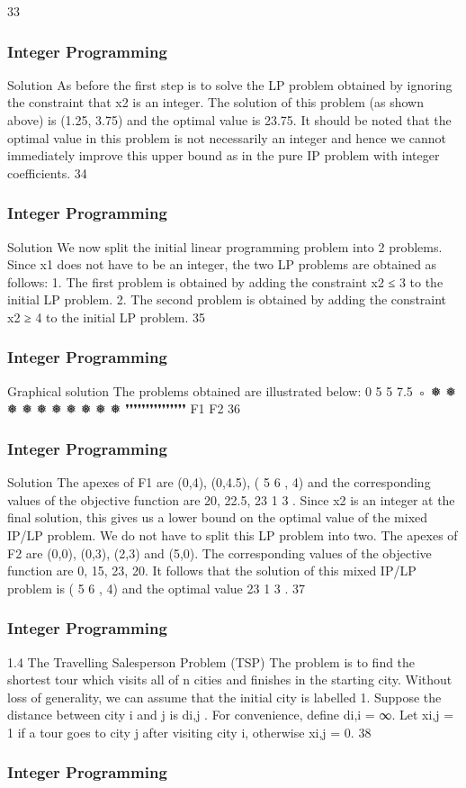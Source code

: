 \begin{frame}
33 \end{frame}  \begin{frame} \frametitle{Integer Programming}     
Solution
As before the first step is to solve the LP problem obtained by
ignoring the constraint that x2 is an integer. The solution of this
problem (as shown above) is (1.25, 3.75) and the optimal value is
23.75.
It should be noted that the optimal value in this problem is not
necessarily an integer and hence we cannot immediately improve
this upper bound as in the pure IP problem with integer
coefficients.
34 \end{frame}  \begin{frame} \frametitle{Integer Programming}     
Solution
We now split the initial linear programming problem into 2
problems. Since x1 does not have to be an integer, the two LP
problems are obtained as follows:
1. The first problem is obtained by adding the
constraint x2 ≤ 3 to the initial LP problem.
2. The second problem is obtained by adding the
constraint x2 ≥ 4 to the initial LP problem.
35 \end{frame}  \begin{frame} \frametitle{Integer Programming}     
Graphical solution
The problems obtained are illustrated below:
0
5
5 7.5
◦
❅
❅
❅
❅
❅
❅
❅
❅
❅
❅
❜❜❜❜❜❜❜❜❜❜❜❜❜❜❜
F1
F2
36 \end{frame}  \begin{frame} \frametitle{Integer Programming}     
Solution
The apexes of F1 are (0,4), (0,4.5), ( 5
6
, 4) and the corresponding
values of the objective function are 20, 22.5, 23 1
3
.
Since x2 is an integer at the final solution, this gives us a lower
bound on the optimal value of the mixed IP/LP problem. We do
not have to split this LP problem into two.
The apexes of F2 are (0,0), (0,3), (2,3) and (5,0). The
corresponding values of the objective function are 0, 15, 23, 20. It
follows that the solution of this mixed IP/LP problem is ( 5
6
, 4) and
the optimal value 23 1
3
.
37 \end{frame}  \begin{frame} \frametitle{Integer Programming}     
1.4 The Travelling Salesperson Problem (TSP)
The problem is to find the shortest tour which visits all of n cities
and finishes in the starting city.
Without loss of generality, we can assume that the initial city is
labelled 1.
Suppose the distance between city i and j is di,j
. For convenience,
define di,i = ∞.
Let xi,j = 1 if a tour goes to city j after visiting city i, otherwise
xi,j = 0.
38 \end{frame}  \begin{frame} \frametitle{Integer Programming}     

\end{frame}
